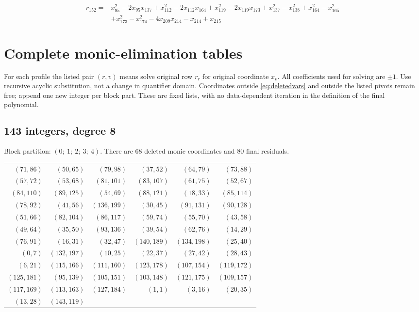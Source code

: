 \documentclass[10pt,letterpaper]{article}
\theoremstyle{remark}\newtheorem{remark}[theorem]{Remark}
\begin{document}
\begin{align*}
r_{152}={}&x_{95}^{2}-2x_{95}x_{137}+x_{112}^{2}-2x_{112}x_{164}+x_{119}^{2}-2x_{119}x_{173}+x_{137}^{2}-x_{138}^{2}+x_{164}^{2}-x_{165}^{2}\\
&+x_{173}^{2}-x_{174}^{2}-4x_{209}x_{214}-x_{214}+x_{215}
\end{align*}

\endgroup


\section{Complete monic-elimination tables}\label{app:pivots}
For each profile the listed pair $(r,v)$ means solve original row $r_r$
for original coordinate $x_v$. All coefficients used for solving are
$\pm1$. Use recursive acyclic substitution, not a change in quantifier
domain. Coordinates outside \eqref{eq:deletedvars} and outside the
listed pivots remain free; append one new integer per block part.
These are fixed lists, with no data-dependent iteration in the
definition of the final polynomial.
\subsection{143 integers, degree 8}
Block partition: $(0;\ 1;\ 2;\ 3;\ 4)$.
There are 68 deleted monic coordinates and 80 final residuals.
\begin{center}\small\begin{tabular}{rrrrrr}\toprule
$(71,86)$ & $(50,65)$ & $(79,98)$ & $(37,52)$ & $(64,79)$ & $(73,88)$\\
$(57,72)$ & $(53,68)$ & $(81,101)$ & $(83,107)$ & $(61,75)$ & $(52,67)$\\
$(84,110)$ & $(89,125)$ & $(54,69)$ & $(88,121)$ & $(18,33)$ & $(85,114)$\\
$(78,92)$ & $(41,56)$ & $(136,199)$ & $(30,45)$ & $(91,131)$ & $(90,128)$\\
$(51,66)$ & $(82,104)$ & $(86,117)$ & $(59,74)$ & $(55,70)$ & $(43,58)$\\
$(49,64)$ & $(35,50)$ & $(93,136)$ & $(39,54)$ & $(62,76)$ & $(14,29)$\\
$(76,91)$ & $(16,31)$ & $(32,47)$ & $(140,189)$ & $(134,198)$ & $(25,40)$\\
$(0,7)$ & $(132,197)$ & $(10,25)$ & $(22,37)$ & $(27,42)$ & $(28,43)$\\
$(6,21)$ & $(115,166)$ & $(111,160)$ & $(123,178)$ & $(107,154)$ & $(119,172)$\\
$(125,181)$ & $(95,139)$ & $(105,151)$ & $(103,148)$ & $(121,175)$ & $(109,157)$\\
$(117,169)$ & $(113,163)$ & $(127,184)$ & $(1,1)$ & $(3,16)$ & $(20,35)$\\
$(13,28)$ & $(143,119)$ &  &  &  & \\
\bottomrule\end{tabular}\end{center}
\end{document}
